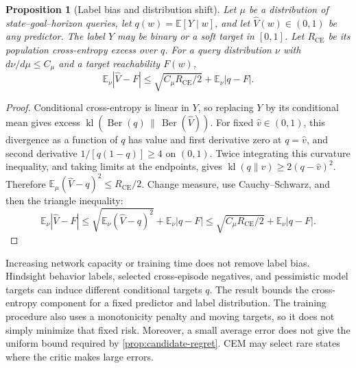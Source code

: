 \documentclass{article}
\newcommand{\EE}{\mathbb E}
\newtheorem{proposition}[theorem]{Proposition}
\theoremstyle{definition}
\theoremstyle{remark}
\begin{document}
\begin{proposition}[Label bias and distribution shift]
\label{prop:bce}
Let $\mu$ be a distribution of state--goal--horizon queries, let
$q(w)=\EE[Y\mid w]$, and let $\hat V(w)\in(0,1)$ be any predictor.
The label $Y$ may be binary or a soft target in $[0,1]$.
Let $R_{\mathrm{CE}}$ be its population cross-entropy excess over $q$.
For a query distribution $\nu$ with $d\nu/d\mu\le C_\mu$ and a target reachability
$F(w)$,
\begin{equation}
 \EE_\nu|\hat V-F|
 \le \sqrt{C_\mu R_{\mathrm{CE}}/2}+\EE_\nu|q-F|.
 \label{eq:bce-transfer}
\end{equation}
\end{proposition}
\begin{proof}
Conditional cross-entropy is linear in $Y$, so replacing $Y$ by its conditional
mean gives excess
$\operatorname{kl}(\operatorname{Ber}(q)\,\|\,\operatorname{Ber}(\hat V))$.
For fixed $\hat v\in(0,1)$, this divergence as a function of $q$ has value and
first derivative zero at $q=\hat v$, and second derivative
$1/[q(1-q)]\ge4$ on $(0,1)$.
Twice integrating this curvature inequality, and taking limits at the endpoints,
gives $\operatorname{kl}(q\|\hat v)\ge2(q-\hat v)^2$.
Therefore
$\EE_\mu(\hat V-q)^2\le R_{\mathrm{CE}}/2$.
Change measure, use Cauchy--Schwarz, and then the triangle inequality:
\[
 \EE_\nu|\hat V-F|
 \le\sqrt{\EE_\nu(\hat V-q)^2}+\EE_\nu|q-F|
 \le\sqrt{C_\mu R_{\mathrm{CE}}/2}+\EE_\nu|q-F|.
\]
\end{proof}
Increasing network capacity or training time does not remove label bias.
Hindsight behavior labels, selected cross-episode negatives, and pessimistic model
targets can induce different conditional targets $q$.
The result bounds the cross-entropy component for a fixed predictor and label distribution.
The training procedure also uses a monotonicity penalty and moving targets, so it does
not simply minimize that fixed risk. Moreover, a small average error does not give the
uniform bound required by \cref{prop:candidate-regret}. CEM may select rare states
where the critic makes large errors.
\end{document}
